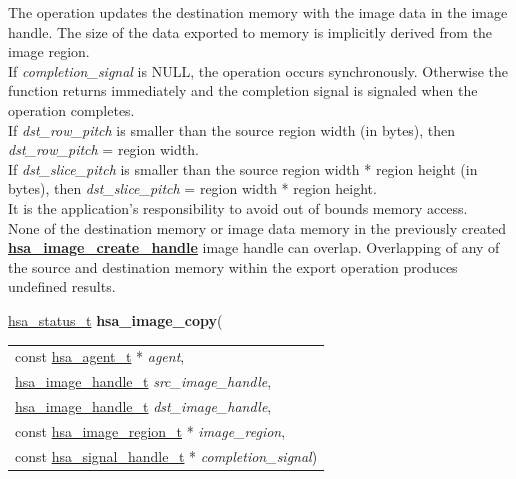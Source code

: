 \documentclass[final]{book}
\newcommand{\hsaarg}[1]{\textit{#1}}
\newcommand{\reffun}[1]{\textbf{#1}}
\begin{document}
\begin{appendices}
The operation updates the destination memory with the image data in the image handle. The size of the data exported to memory is implicitly derived from the image region.\\[2mm]
If \textit{completion_signal} is NULL, the operation occurs synchronously. Otherwise the function returns immediately and the completion signal is signaled when the operation completes.\\[2mm]
If \textit{dst_row_pitch} is smaller than the source region width (in bytes), then \textit{dst_row_pitch} = region width.\\[2mm]
If \textit{dst_slice_pitch} is smaller than the source region width * region height (in bytes), then \textit{dst_slice_pitch} = region width * region height.\\[2mm]
It is the application's responsibility to avoid out of bounds memory access.\\[2mm]
None of the destination memory or image data memory in the previously created \hyperlink{group--images-1gad80ea369867549c5b313c08134beec83}{\reffun{hsa_image_create_handle}} image handle can overlap. Overlapping of any of the source and destination memory within the export operation produces undefined results. 


\noindent\begin{tcolorbox}[breakable,nobeforeafter,colframe=white,colback=lightgray,left=0mm]
\hyperlink{group--status-1gad755322e7ff95456520e8abdbe90d225}{hsa_status_t} \hypertarget{group--images-1ga544f92392f1fac07d6b7612e111b9765}{\textbf{hsa_image_copy}}(
\vspace{-3.5mm}\begin{longtable}{@{}p{\textwidth}}
\hspace{1.7em}const \hyperlink{group--topology-1gab8db3fb886332a24acac08ec361e1d86}{hsa_agent_t} * \hsaarg{agent},\\
\hspace{1.7em}\hyperlink{group--images-1ga0aeecea8e818df4cec2eccb3a5e85d5f}{hsa_image_handle_t} \hsaarg{src_image_handle},\\
\hspace{1.7em}\hyperlink{group--images-1ga0aeecea8e818df4cec2eccb3a5e85d5f}{hsa_image_handle_t} \hsaarg{dst_image_handle},\\
\hspace{1.7em}const \hyperlink{group--images-1ga9d9acd37f7eb5a68c81b63b5ad082529}{hsa_image_region_t} * \hsaarg{image_region},\\
\hspace{1.7em}const \hyperlink{group--signals-1ga6592c136d70853d855bc11d9efdbf534}{hsa_signal_handle_t} * \hsaarg{completion_signal})\end{longtable}


\end{tcolorbox}
\end{appendices}
\end{document}
